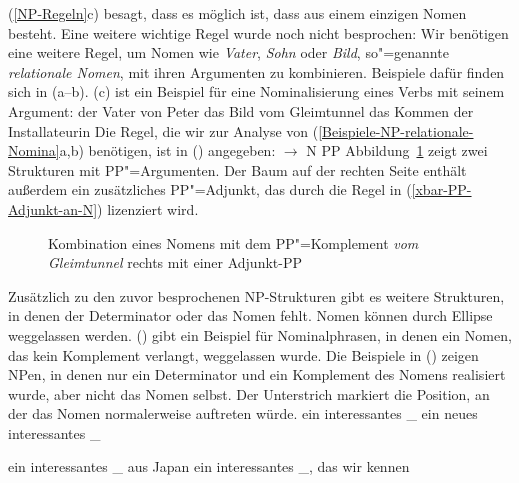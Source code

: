 (\ref{NP-Regeln}c) besagt, dass es möglich ist, dass \nbar aus einem einzigen Nomen besteht. Eine weitere wichtige Regel wurde noch nicht
besprochen: Wir benötigen eine weitere Regel, um Nomen wie \emph{Vater}, \emph{Sohn} oder \emph{Bild},
so"=genannte \emph{relationale Nomen}, mit ihren Argumenten zu kombinieren. Beispiele dafür finden sich in (a--b).
(c) ist ein Beispiel für eine Nominalisierung eines Verbs mit seinem Argument:
\eal
\label{Beispiele-NP-relationale-Nomina}
\ex
der Vater von Peter
\ex
das Bild vom Gleimtunnel
\ex
das Kommen der Installateurin
\zl
\noindent
Die Regel, die wir zur Analyse von (\ref{Beispiele-NP-relationale-Nomina}a,b) benötigen, ist in
() angegeben:
\ea
\nbar $\to$ N PP
\z
%
Abbildung~\ref{Abbildung-NP-mit-PP-Argument} zeigt zwei Strukturen mit PP"=Argumenten. Der Baum auf der rechten Seite enthält außerdem ein zusätzliches PP"=Adjunkt, das durch
die Regel in (\ref{xbar-PP-Adjunkt-an-N}) lizenziert wird.
\begin{figure}
\caption{\label{Abbildung-NP-mit-PP-Argument}Kombination eines Nomens mit dem PP"=Komplement
  \emph{vom Gleimtunnel} rechts mit einer Adjunkt-PP}
\end{figure}%

Zusätzlich zu den zuvor besprochenen NP-Strukturen gibt es weitere Strukturen, in denen der
Determinator oder das Nomen fehlt.
Nomen können durch Ellipse weggelassen werden. () gibt ein Beispiel für Nominalphrasen, in denen ein Nomen, das kein Komplement verlangt,
weggelassen wurde. Die Beispiele in () zeigen NPen, in denen nur ein Determinator und ein Komplement des Nomens realisiert wurde,
aber nicht das Nomen selbst. Der Unterstrich markiert die Position, an der das Nomen normalerweise auftreten würde.
\eal
\label{ex-nounless-np}
\ex
ein interessantes \_
\ex
ein neues interessantes \_

\ex
ein interessantes \_ aus  Japan
\ex
ein interessantes \_, das  wir kennen
\zl

